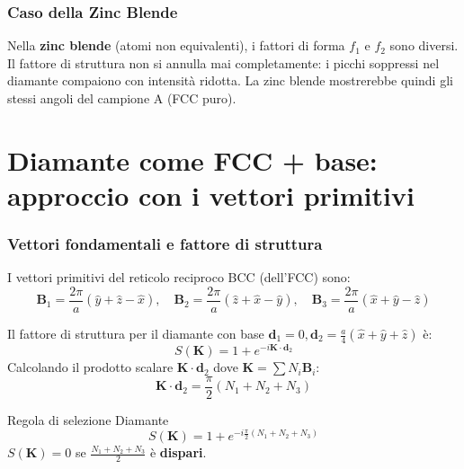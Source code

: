 \subsubsection{Caso della Zinc Blende}

\begin{nota}
    Nella \textbf{zinc blende} (atomi non equivalenti), i fattori di forma $f_1$ e $f_2$ sono diversi. Il fattore di struttura non si annulla mai completamente: i picchi soppressi nel diamante compaiono con intensità ridotta. La zinc blende mostrerebbe quindi gli stessi angoli del campione A (FCC puro).
\end{nota}

\section{Diamante come FCC + base: approccio con i vettori primitivi}

\subsubsection{Vettori fondamentali e fattore di struttura}

I vettori primitivi del reticolo reciproco BCC (dell'FCC) sono:
\begin{equation}
    \mathbf{B}_1 = \frac{2\pi}{a}(\hat{y} + \hat{z} - \hat{x}), \quad \mathbf{B}_2 = \frac{2\pi}{a}(\hat{z} + \hat{x} - \hat{y}), \quad \mathbf{B}_3 = \frac{2\pi}{a}(\hat{x} + \hat{y} - \hat{z})
\end{equation}

Il fattore di struttura per il diamante con base $\mathbf{d}_1 = 0, \mathbf{d}_2 = \frac{a}{4}(\hat{x}+\hat{y}+\hat{z})$ è:
\begin{equation}
    S(\mathbf{K}) = 1 + e^{-i\mathbf{K}\cdot\mathbf{d}_2}
\end{equation}
Calcolando il prodotto scalare $\mathbf{K} \cdot \mathbf{d}_2$ dove $\mathbf{K} = \sum N_i \mathbf{B}_i$:
\begin{equation}
    \mathbf{K} \cdot \mathbf{d}_2 = \frac{\pi}{2}(N_1 + N_2 + N_3)
\end{equation}

\begin{equazione}{Regola di selezione Diamante}
    \begin{equation}
        S(\mathbf{K}) = 1 + e^{-i\frac{\pi}{2}(N_1 + N_2 + N_3)}
    \end{equation}
    $S(\mathbf{K}) = 0$ se $\frac{N_1+N_2+N_3}{2}$ è \textbf{dispari}.
\end{equazione}

